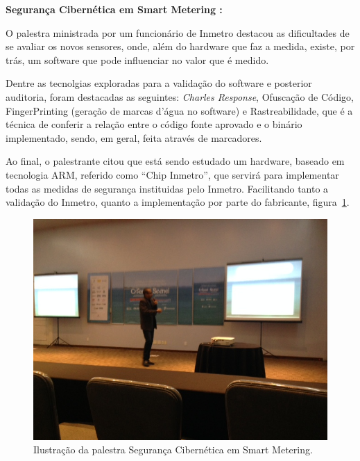 
\textbf{Segurança Cibernética em Smart Metering :}

O palestra ministrada por um funcionário de Inmetro destacou as dificultades de
se avaliar os novos sensores, onde, além do hardware que faz a medida, existe,
por trás, um software que pode influenciar no valor que é medido.

Dentre as tecnolgias exploradas para a validação do software e posterior
auditoria, foram destacadas as seguintes: \textit{Charles Response}, Ofuscação
de Código, FingerPrinting (geração de marcas d'água no software) e
Rastreabilidade, que é a técnica de conferir a relação entre o código fonte
aprovado e o binário implementado, sendo, em geral, feita através de marcadores.

Ao final, o palestrante citou que está sendo estudado um hardware, baseado em
tecnologia ARM, referido como ``Chip Inmetro'', que servirá para implementar
todas as medidas de segurança instituidas pelo Inmetro. Facilitando tanto a
validação do Inmetro, quanto a implementação por parte do fabricante,
figura~\ref{fig::inmetro}.

\begin{figure}[h!]	
	\includegraphics[width=\columnwidth]{figs/inmetro.JPG}
	\caption{Ilustração da palestra Segurança Cibernética em Smart Metering.}
	\label{fig::inmetro}
\end{figure}